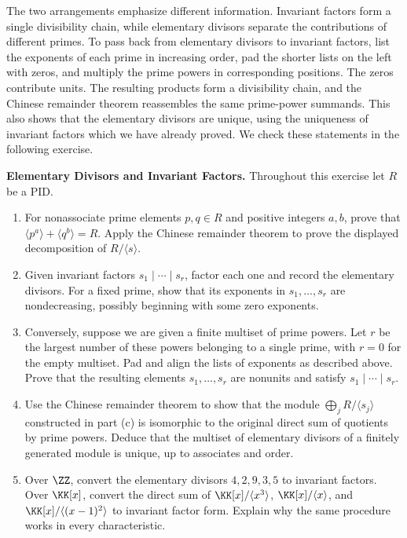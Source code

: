 \documentclass[12pt,reqno]{amsart}
\begin{document}
The two arrangements emphasize different information. Invariant factors form a single divisibility chain, while elementary divisors separate the contributions of different primes. To pass back from elementary divisors to invariant factors, list the exponents of each prime in increasing order, pad the shorter lists on the left with zeros, and multiply the prime powers in corresponding positions. The zeros contribute units. The resulting products form a divisibility chain, and the Chinese remainder theorem reassembles the same prime-power summands. This also shows that the elementary divisors are unique, using the uniqueness of invariant factors which we have already proved. We check these statements in the following exercise.

\hrulefill

\begin{problems}
\item\label{s:elementary} \textbf{Elementary Divisors and Invariant Factors.} Throughout this exercise let $R$ be a PID.
\begin{enumerate}
\item For nonassociate prime elements $p,q\in R$ and positive integers $a,b$, prove that $\langle p^a\rangle+\langle q^b\rangle=R$. Apply the Chinese remainder theorem to prove the displayed decomposition of $R/\langle s\rangle$.
\item Given invariant factors $s_1\mid\cdots\mid s_r$, factor each one and record the elementary divisors. For a fixed prime, show that its exponents in $s_1,\ldots,s_r$ are nondecreasing, possibly beginning with some zero exponents.
\item Conversely, suppose we are given a finite multiset of prime powers. Let $r$ be the largest number of these powers belonging to a single prime, with $r=0$ for the empty multiset. Pad and align the lists of exponents as described above. Prove that the resulting elements $s_1,\ldots,s_r$ are nonunits and satisfy $s_1\mid\cdots\mid s_r$.
\item Use the Chinese remainder theorem to show that the module $\bigoplus_jR/\langle s_j\rangle$ constructed in part (c) is isomorphic to the original direct sum of quotients by prime powers. Deduce that the multiset of elementary divisors of a finitely generated module is unique, up to associates and order.
\item Over $\ZZ$, convert the elementary divisors $4,2,9,3,5$ to invariant factors. Over $\KK[x]$, convert the direct sum of $\KK[x]/\langle x^3\rangle$, $\KK[x]/\langle x\rangle$, and $\KK[x]/\langle(x-1)^2\rangle$ to invariant factor form. Explain why the same procedure works in every characteristic.
\end{enumerate}
\end{problems}
\end{document}
